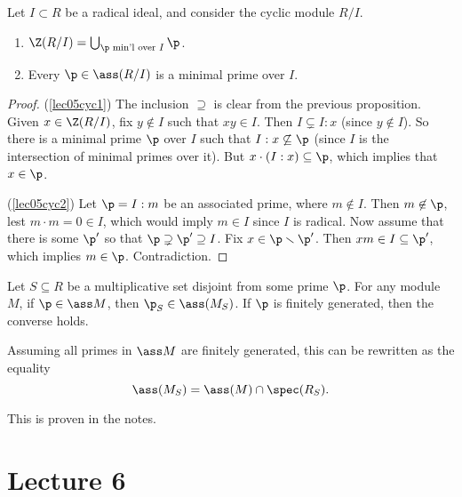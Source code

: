  \begin{theorem}\label{lec05radNOembedded}
   Let $I\subset R$ be a radical ideal, and consider the cyclic module $R/I$.
   \begin{enumerate}
     \item \label{lec05cyc1} $\Z(R/I) = \bigcup_{\p\text{ min'l over } I} \p$.
     \item \label{lec05cyc2} Every $\p\in \ass (R/I)$ is a minimal prime over $I$.
   \end{enumerate}
 \end{theorem}
 \begin{proof}
   (\ref{lec05cyc1}) The inclusion $\supseteq$ is clear from the previous proposition.
   Given $x\in \Z(R/I)$, fix $y\not\in I$ such that $xy\in I$. Then $I\subsetneq I:x$
   (since $y\not\in I$). So there is a minimal prime $\p$ over $I$ such that
   $I:x\not\subseteq \p$ (since $I$ is the intersection of minimal primes over it). But
   $x\cdot (I:x)\subseteq \p$, which implies that $x\in \p$.

   (\ref{lec05cyc2}) Let $\p=I:m$ be an associated prime, where $m\not\in I$. Then
   $m\not\in \p$, lest $m\cdot m=0\in I$, which would imply $m\in I$ since $I$ is
   radical. Now assume that there  is some $\p'$ so that $\p\supsetneq \p'\supseteq I$.
   Fix $x\in \p\smallsetminus \p'$. Then $xm\in I\subseteq \p'$, which implies $m\in \p$.
   Contradiction.
 \end{proof}

 \begin{proposition}
   Let $S\subseteq R$ be a multiplicative set disjoint from some prime $\p$. For any
   module $M$, if $\p\in \ass M$, then $\p_S\in \ass (M_S)$. If $\p$ is finitely
   generated, then the converse holds.
 \end{proposition}
 Assuming all primes in $\ass M$ are finitely generated, this can be rewritten as the
 equality
 \[
    \ass (M_S) = \ass(M) \cap \spec (R_S).
 \]

 This is proven in the notes. \anton{}
 \setcounter{lecture}{6}
 \section{Lecture 6}

 \renewcommand\P{\mathcal{P}}

